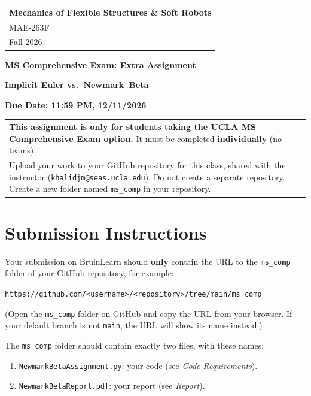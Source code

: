 \documentclass[letterpaper,11pt]{article}
\begin{document}
\thispagestyle{fancy}

\begin{tabular}{@{}p{\linewidth}@{}}
{\large \bf Mechanics of Flexible Structures \& Soft Robots} \\
MAE-263F \\ Fall 2026 \\
\hline
\end{tabular}

\vspace*{0.0cm}

\begin{center}
    {\Large \bf MS Comprehensive Exam: Extra Assignment}
    \vspace{2mm}

    {\bf Implicit Euler vs.\ Newmark--Beta}
    \vspace{2mm}

    {\bf Due Date: 11:59 PM, 12/11/2026}
\end{center}

\begin{tabular}{@{}p{\linewidth}@{}}
\textbf{This assignment is only for students taking the UCLA MS Comprehensive Exam option.} It must be completed \textbf{individually} (no teams).
\\[1mm]
Upload your work to your GitHub repository for this class, shared with the instructor (\texttt{khalidjm@seas.ucla.edu}). Do not create a separate repository. Create a new folder named \texttt{ms\_comp} in your repository.
\\
\hline
\end{tabular}

\section*{Submission Instructions}

Your submission on BruinLearn should \textbf{only} contain the URL to the \texttt{ms\_comp} folder of your GitHub repository, for example:
\begin{center}
\texttt{https://github.com/<username>/<repository>/tree/main/ms\_comp}
\end{center}
(Open the \texttt{ms\_comp} folder on GitHub and copy the URL from your browser. If your default branch is not \texttt{main}, the URL will show its name instead.)

The \texttt{ms\_comp} folder should contain exactly two files, with these names:
\begin{enumerate}
    \item \texttt{NewmarkBetaAssignment.py}: your code (see \emph{Code Requirements}).
    \item \texttt{NewmarkBetaReport.pdf}: your report (see \emph{Report}).
\end{enumerate}
\end{document}
